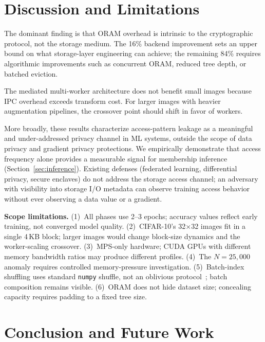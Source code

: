 \documentclass{llncs}
\begin{document}
\section{Discussion and Limitations}
\label{sec:limitations}

The dominant finding is that ORAM overhead is intrinsic to the cryptographic protocol, not the storage medium.
The 16\% backend improvement sets an upper bound on what storage-layer engineering can achieve; the remaining 84\% requires algorithmic improvements such as concurrent ORAM, reduced tree depth, or batched eviction.

The mediated multi-worker architecture does not benefit small images because IPC overhead exceeds transform cost.
For larger images with heavier augmentation pipelines, the crossover point should shift in favor of workers.

More broadly, these results characterize access-pattern leakage as a meaningful and under-addressed privacy channel in ML systems, outside the scope of data privacy and gradient privacy protections.
We empirically demonstrate that access frequency alone provides a measurable signal for membership inference (Section~\ref{sec:inference}).
Existing defenses (federated learning, differential privacy, secure enclaves) do not address the storage access channel; an adversary with visibility into storage I/O metadata can observe training access behavior without ever observing a data value or a gradient.

\medskip
\noindent\textbf{Scope limitations.}
(1)~All phases use 2--3 epochs; accuracy values reflect early training, not converged model quality.
(2)~CIFAR-10's 32$\times$32 images fit in a single 4\,KB block; larger images would change block-size dynamics and the worker-scaling crossover.
(3)~MPS-only hardware; CUDA GPUs with different memory bandwidth ratios may produce different profiles.
(4)~The $N{=}25{,}000$ anomaly requires controlled memory-pressure investigation.
(5)~Batch-index shuffling uses standard \texttt{numpy} shuffle, not an oblivious protocol~\cite{ngai2024}; batch composition remains visible.
(6)~ORAM does not hide dataset size; concealing capacity requires padding to a fixed tree size.

\section{Conclusion and Future Work}
\end{document}
